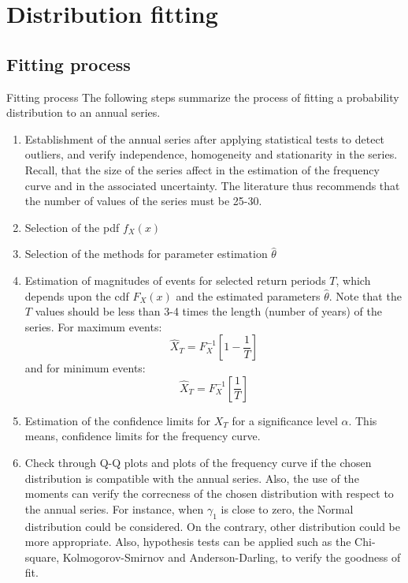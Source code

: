 \documentclass[8pt]{beamer}
\renewcommand{\emph}[1]{\textcolor{myorange}{#1}}
\begin{document}
\section{Distribution fitting}
\subsection{Fitting process}
\begin{frame}{Fitting process}
    The following steps summarize the process of fitting a probability distribution to an annual series.
    \begin{enumerate}
        \item Establishment of the annual series after applying statistical tests to detect \emph{outliers}, and verify  \emph{independence}, \emph{homogeneity} and \emph{stationarity} in the series. Recall, that the size of the series affect in the estimation of the \emph{frequency curve} and in the associated uncertainty. The literature thus recommends that the number of values of the series must be 25-30. 
        \item Selection of the \emph{pdf} $f_X (x)$
        \item Selection of the methods for parameter estimation $\hat{\theta}$
        \item Estimation of magnitudes of events for selected \emph{return periods} $T$, which depends upon the \emph{cdf} $F_X (x)$ and the estimated parameters $\hat{\theta}$. Note that the $T$ values should be less than 3-4 times the length (number of years) of the series. For maximum events:
            \vspace{-5pt}
            \[
                \hat{X}_T = F_X^{-1} \left[ 1-\frac{1}{T} \right]
            \]
            and for minimum events:
            \vspace{-5pt}
            \[
                \hat{X}_T = F_X^{-1} \left[ \frac{1}{T} \right]
            \]
        \item Estimation of the \emph{confidence limits} for $X_T$ for a significance level $\alpha$. This means, confidence limits for the frequency curve. 
        \item Check through  Q-Q plots and plots of the frequency curve if the chosen distribution is compatible with the annual series. Also, the use of the moments can verify the correcness of the chosen distribution with respect to the annual series. For instance, when $\gamma_1$ is close to zero, the \emph{Normal distribution} could be considered. On the contrary, other distribution could be more appropriate. Also, hypothesis tests can be applied such as the \emph{Chi-square}, \emph{Kolmogorov-Smirnov} and \emph{Anderson-Darling}, to verify the goodness of fit.
   \end{enumerate}

\end{frame}
\end{document}

